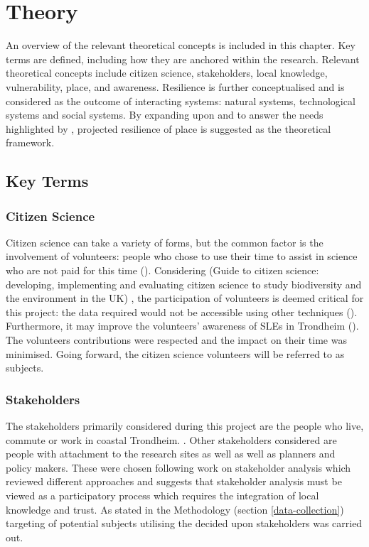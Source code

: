 
\chapter{Theory}


An overview of the relevant theoretical concepts is included in this chapter. Key terms are defined, including how they are anchored within the research. Relevant theoretical concepts include citizen science, stakeholders, local knowledge, vulnerability, place, and awareness. Resilience is further conceptualised and is considered as the outcome of interacting systems: natural systems, technological systems and social systems. By expanding upon \cite{cutter_place-based_2008} and \cite{cutter_community_2020} to answer the needs highlighted by \cite{rasanen_conceptualizing_2020}, projected resilience of place is suggested as the theoretical framework.

\section{Key Terms}


\subsection{Citizen Science}
Citizen science can take a variety of forms, but the common factor is the involvement of volunteers: people who chose to use their time to assist in science who are not paid for this time (\cite{pocock_choosing_2014}). Considering \cite{tweddle_guide_2012} (Guide to citizen science: developing, implementing and evaluating citizen science to study biodiversity and the environment in the UK) , the participation of volunteers is deemed critical for this project: the data required would not be accessible using other techniques (\cite{tweddle_guide_2012}). Furthermore, it may improve the volunteers' awareness of SLEs in Trondheim (\cite{gerkensmeier_governing_2018}).  The volunteers contributions were respected and the impact on their time was minimised. Going forward, the citizen science volunteers will be referred to as subjects. 

\subsection{Stakeholders}
The stakeholders primarily considered during this project are the people who live, commute or work in coastal Trondheim. . Other stakeholders considered are people with attachment to the research sites as well as well as planners and policy makers. These were chosen following \cite{reed_stakeholder_2008} work on stakeholder analysis which reviewed different approaches and suggests that stakeholder analysis must be viewed as a participatory process which requires the integration of local knowledge and trust. As stated in the Methodology (section \ref{data-collection}) targeting of potential subjects utilising the decided upon stakeholders was carried out. 


